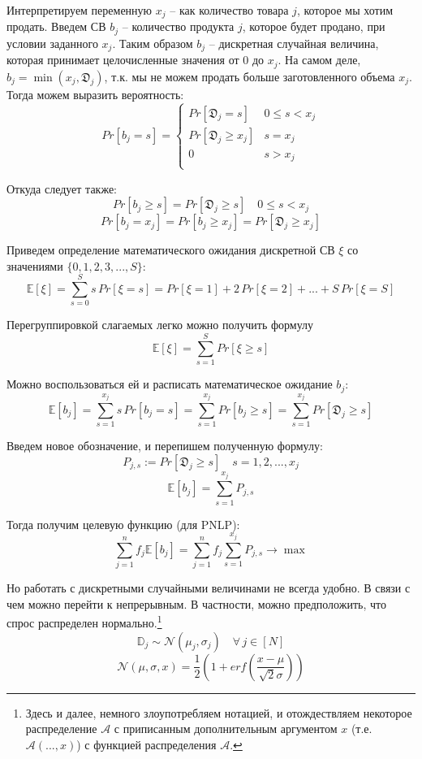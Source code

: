 \documentclass[reqno]{article}
\theoremstyle{definition}
\theoremstyle{definition}
\theoremstyle{definition}
\theoremstyle{definition}
\theoremstyle{definition}
\theoremstyle{definition}
\theoremstyle{definition}
\theoremstyle{definition}
\theoremstyle{definition}
\begin{document}
		Интерпретируем переменную $x_j$ -- как количество товара $j$, которое мы хотим продать. Введем СВ $b_j$ -- количество продукта $j$, которое будет продано, при условии заданного $x_j$. Таким образом $b_j$ -- дискретная случайная величина, которая принимает целочисленные значения от $0$ до $x_j$. На самом деле, $b_j = \min(x_j, \mathfrak{D}_j)$, т.к. мы не можем продать больше заготовленного объема $x_j$. Тогда можем выразить вероятность:
		$$
		Pr[b_j = s] = 
		\begin{cases}
			Pr[\mathfrak{D}_j = s] & 0 \leq s < x_j \\
			Pr[\mathfrak{D}_j \geq x_j] & s = x_j \\
			0 & s > x_j \\
		\end{cases}
		$$
		
		Откуда следует также:
		$$Pr[b_j \geq s] = Pr[\mathfrak{D}_j \geq s]\quad 0 \leq s < x_j$$
		$$Pr[b_j = x_j] = Pr[b_j \geq x_j] = Pr[\mathfrak{D}_j \geq x_j]$$
		
		Приведем определение математического ожидания дискретной СВ $\xi$ со значениями $\{0, 1, 2, 3, ..., S\}$:
		$$\mathds{E}[\xi] = \sum\limits_{s = 0}^S s\,Pr[\xi = s] = Pr[\xi = 1] + 2\,Pr[\xi = 2] + ... + S\,Pr[\xi = S]$$
		
		Перегруппировкой слагаемых легко можно получить формулу
		\begin{equation}
			\mathds{E}[\xi] = \sum\limits_{s = 1}^S Pr[\xi \geq s]
		\end{equation}
	
		Можно воспользоваться ей и расписать математическое ожидание $b_j$:
		$$\mathds{E}[b_j] = \sum\limits_{s = 1}^{x_j} s\,Pr[b_j = s] = \sum\limits_{s = 1}^{x_j} Pr[b_j \geq s] = \sum\limits_{s = 1}^{x_j} Pr[\mathfrak{D}_j \geq s]$$
		
		Введем новое обозначение, и перепишем полученную формулу:
		$$P_{j,s} := Pr[\mathfrak{D}_j \geq s]\quad s = 1, 2, ..., x_j$$
		\begin{equation}
			\mathds{E}[b_j] = \sum\limits_{s = 1}^{x_j} P_{j,s}
		\end{equation}
		
		Тогда получим целевую функцию (для PNLP):
		\begin{equation}
			\sum\limits_{j=1}^n f_j \mathds{E}[b_j] = \sum\limits_{j=1}^n f_j \sum\limits_{s = 1}^{x_j} P_{j,s} \rightarrow \max
		\end{equation}
	
		Но работать с дискретными случайными величинами не всегда удобно. В связи с чем можно перейти к непрерывным. В частности, можно предположить, что спрос распределен нормально.\footnote{Здесь и далее, немного злоупотребляем нотацией, и отождествляем некоторое распределение $\mathcal{A}$ с приписанным дополнительным аргументом $x$ (т.е. $\mathcal{A}(..., x)$) с функцией распределения $\mathcal{A}$.}
		$$\mathds{D}_j \sim \mathcal{N}(\mu_j, \sigma_j) \quad \forall\, j \in [N]$$
		$$\mathcal{N}(\mu, \sigma, x) = \frac{1}{2}(1 + {erf}(\frac{x - \mu}{\sqrt{2}\sigma}))$$
		
\end{document}

